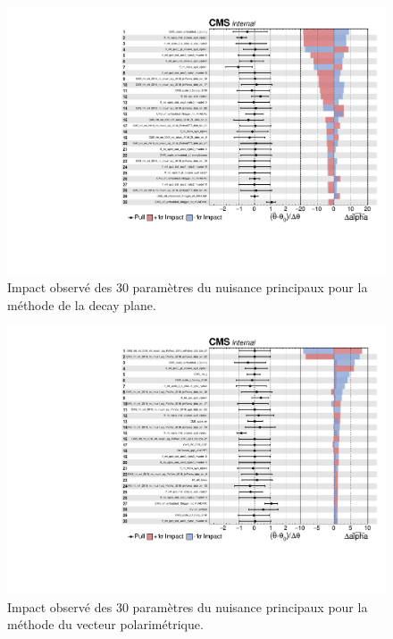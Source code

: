 \begin{figure}[]
        \centering
        \includegraphics[scale=0.6]{Chapitre7/Images/impactsdp18.pdf} 
        \vspace{0.5ex}
    \caption{Impact observé des 30 paramètres du nuisance principaux pour la méthode de la decay plane.}
    \label{observednuisancepv}
\end{figure}

\begin{figure}[]
        \centering
        \includegraphics[scale=0.6]{Chapitre7/Images/impactspv18.pdf} 
        \vspace{0.5ex}
    \caption{Impact observé des 30 paramètres du nuisance principaux pour la méthode du vecteur polarimétrique.}
    \label{observednuisancedp}
\end{figure}

